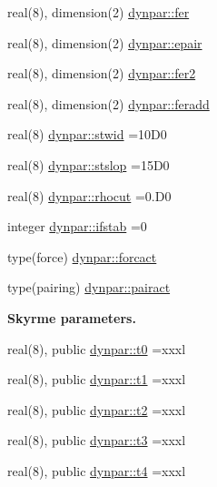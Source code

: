 \begin{DoxyCompactItemize}
\item 
real(8), dimension(2) \hyperlink{namespacedynpar_ad192a883caa277e6894248778b09dc2d}{dynpar\+::fer}
\item 
real(8), dimension(2) \hyperlink{namespacedynpar_ac04788950822d4daab61ae4a7aa49e6f}{dynpar\+::epair}
\item 
real(8), dimension(2) \hyperlink{namespacedynpar_ac8bb49a0c3ecc099232039bfc9eacf7b}{dynpar\+::fer2}
\item 
real(8), dimension(2) \hyperlink{namespacedynpar_af4ed4af756b4cf0507655adc548a0439}{dynpar\+::feradd}
\item 
real(8) \hyperlink{namespacedynpar_a7636644e83a92739e1cf1071ccfd6f6d}{dynpar\+::stwid} =10\+D0
\item 
real(8) \hyperlink{namespacedynpar_a35401f37918ab6873a9141343fd0ecc7}{dynpar\+::stslop} =15\+D0
\item 
real(8) \hyperlink{namespacedynpar_ad4f057977601477d6541c2cca2dd27d4}{dynpar\+::rhocut} =0.\+D0
\item 
integer \hyperlink{namespacedynpar_afab130173434abc128a531270a004014}{dynpar\+::ifstab} =0
\item 
type(force) \hyperlink{namespacedynpar_a3e425cbc7896d63e7533e2c878976405}{dynpar\+::forcact}
\item 
type(pairing) \hyperlink{namespacedynpar_a924d3279ad523c4e4ce6db488f53b781}{dynpar\+::pairact}
\end{DoxyCompactItemize}
\begin{Indent}{\bf Skyrme parameters.}\par
\begin{DoxyCompactItemize}
\item 
real(8), public \hyperlink{namespacedynpar_a2b1194ee3dd6225c16841f068e72dcb1}{dynpar\+::t0} =xxxl
\item 
real(8), public \hyperlink{namespacedynpar_ad299be5ee883b4d581da154ccd7e6122}{dynpar\+::t1} =xxxl
\item 
real(8), public \hyperlink{namespacedynpar_a7f9cd17747b9e2e1cf0b61fa6bd67f95}{dynpar\+::t2} =xxxl
\item 
real(8), public \hyperlink{namespacedynpar_abd8caac07066c74344144e7013b2fae8}{dynpar\+::t3} =xxxl
\item 
real(8), public \hyperlink{namespacedynpar_afba19ad7aa265b1118bb2717342c26c1}{dynpar\+::t4} =xxxl
\end{DoxyCompactItemize}
\end{Indent}
